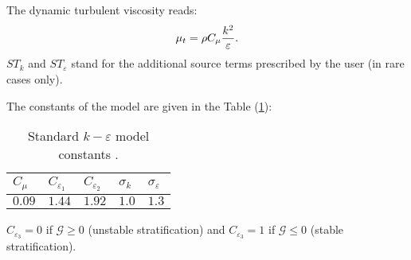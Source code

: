 The dynamic turbulent viscosity reads: 
\begin{equation}
\displaystyle \mu_t=\rho C_\mu\frac{k^2}{%
\varepsilon}.
\end{equation}
$ST_{k}$ and $ST_{\varepsilon}$ stand for the additional
source terms prescribed by the user (in rare cases only).

The constants of the model are given in the Table (\ref{tab:k_epsilon_constants}):
\begin{table}[!htp]
\centering
\begin{tabular}{p{}|p{}|p{}|p{}|p{}}
$C_\mu$ & $C_{\varepsilon_1}$ & $C_{\varepsilon_2}$ & $\sigma_k$ & $%
\sigma_\varepsilon$ \\ \hline
$0.09$ & $1.44$ & $1.92$ & $1.0$ & $1.3$ 
\end{tabular}%
\caption{Standard $k-\varepsilon$ model constants \cite{Launder:1974}.\label{tab:k_epsilon_constants}}
\end{table}

$C_{\varepsilon_3}=0$ if $\mathcal{G}\geqslant0$ (unstable stratification)
and $C_{\varepsilon_3}=1$ if $\mathcal{G}\leqslant0$ (stable stratification).



